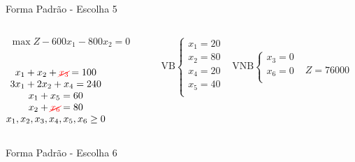 \documentclass{beamer}
\begin{document}
\begin{frame}
{\begin{block}{Forma Padrão - {\color{cyan}Escolha 5}}
			\begin{columns}
				\begin{column}{0.35\textwidth}
					$
						\begin{matrix}
							\max Z - 600x_1 - 800x_2 = 0 \\
						\end{matrix}
					$ \\
					 \\
					$
						\begin{matrix}
							x_1  + x_2  + {\color{red}\cancel{x_3}}                   = 100 \\
							3x_1 + 2x_2       + x_4             = 240 \\
							x_1                     + x_5       = 60 \\
							x_2                           + {\color{red}\cancel{x_6}} = 80 \\
							x_1,x_2, x_3, x_4, x_5, x_6 \ge 0 \\
						\end{matrix}
					$
				\end{column}
				\vline
				\hspace{0.1cm}
				\begin{column}{0.45\textwidth}
						$
							\begin{matrix}
								\text{VB} \left\{  \begin{matrix}
																 x_1 = 20 \\
																 x_2 = 80 \\
																 x_4 = 20 \\
																 x_5 = 40 \\
												   \end{matrix} 
										   \right.
								&
								\text{VNB} \left\{  \begin{matrix}
																 x_3 = 0 \\
																 x_6 = 0 \\
												   \end{matrix} 
										   \right. 
								\\
							 & \\
							\end{matrix}
						$
						{\color{red}$ Z = 76000 $ }
				\end{column}
			\end{columns}
		\end{block}
	}
	{
		\begin{block}{Forma Padrão - {\color{cyan}Escolha 6}}

\end{block}}
\end{frame}
\end{document}
